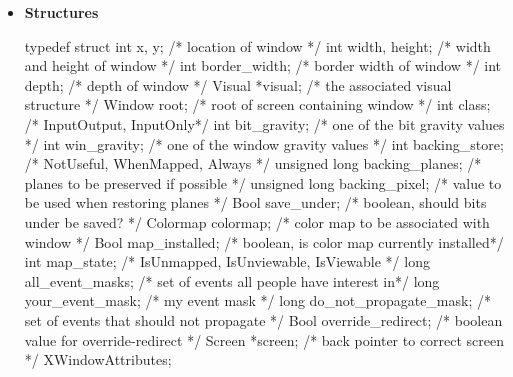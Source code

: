\documentclass{report}
\begin{document}
    \pagebreak 
    \begin{itemize}
        \item \textbf{Structures}
            \begin{cppcode}
                typedef struct {
                    int x, y;                           /* location of window */
                    int width, height;                  /* width and height of window */
                    int border_width;                   /* border width of window */
                    int depth;                          /* depth of window */
                    Visual *visual;                     /* the associated visual structure */
                    Window root;                        /* root of screen containing window */
                    int class;                          /* InputOutput, InputOnly*/
                    int bit_gravity;                    /* one of the bit gravity values */
                    int win_gravity;                    /* one of the window gravity values */
                    int backing_store;                  /* NotUseful, WhenMapped, Always */
                    unsigned long backing_planes;       /* planes to be preserved if possible */
                    unsigned long backing_pixel;        /* value to be used when restoring planes */
                    Bool save_under;                    /* boolean, should bits under be saved? */
                    Colormap colormap;                  /* color map to be associated with window */
                    Bool map_installed;                 /* boolean, is color map currently installed*/
                    int map_state;                      /* IsUnmapped, IsUnviewable, IsViewable */
                    long all_event_masks;               /* set of events all people have interest in*/
                    long your_event_mask;               /* my event mask */
                    long do_not_propagate_mask;         /* set of events that should not propagate */
                    Bool override_redirect;             /* boolean value for override-redirect */
                    Screen *screen;                     /* back pointer to correct screen */
                } XWindowAttributes;
            \end{cppcode}


\end{itemize}
\end{document}
